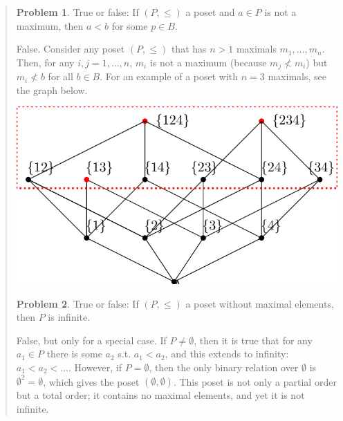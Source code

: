 \documentclass[a4paper, 12pt]{article}
\theoremstyle{definition}
\newtheorem{problem}{Problem}
\theoremstyle{definition}
\theoremstyle{definition}
\begin{document}
\small
\begin{quote}

\begin{problem}
    True or false: If $(P, \leq) $ a poset and $a \in P$ is not a maximum, then
    $a < b$ for some $p \in B$.
\end{problem}

False. Consider any poset $(P, \leq) $ that has $n > 1$ maximals $m_1, \ldots,
m_n$.
Then, for any $i, j = 1, \ldots, n$, $m_i$ is not a maximum (because $m_j \not<
m_i$) but $m_i \not< b$ for all $b \in B$. For an example of a poset with $n =
3$ maximals, see the graph below.

\begin{center}
\includegraphics[scale=1]{threemaximals}
\end{center}

\begin{problem}
    True or false: If $(P, \leq) $ a poset without maximal elements, then $P$ is
    infinite.
\end{problem}

False, but only for a special case. If $P \neq \emptyset$, then it is true that
for any $a_1 \in P$ there is some $a_2$ s.t. $a_1 < a_2$, and this extends to
infinity: $a_1 < a_2 < \ldots $. However, if $P = \emptyset$, then the only
binary relation over $\emptyset$ is $\emptyset^2 = \emptyset$, which gives the
poset $(\emptyset, \emptyset)$. This poset is not only a partial order but a
total order; it contains no maximal elements, and yet it is not infinite.

\end{quote}
\normalsize


\end{document}
